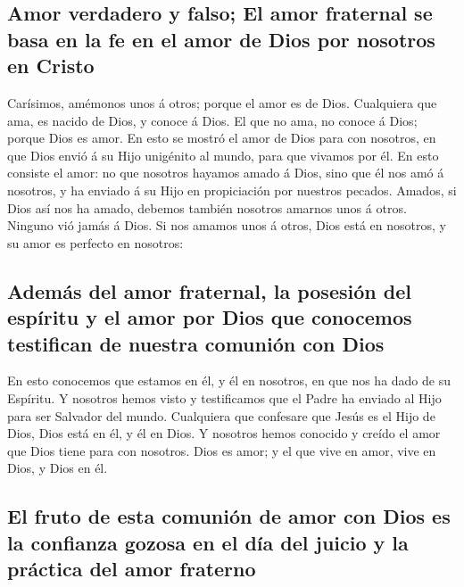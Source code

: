 \hypertarget{amor-verdadero-y-falso-el-amor-fraternal-se-basa-en-la-fe-en-el-amor-de-dios-por-nosotros-en-cristo}{%
\subsection{Amor verdadero y falso; El amor fraternal se basa en la fe
en el amor de Dios por nosotros en
Cristo}\label{amor-verdadero-y-falso-el-amor-fraternal-se-basa-en-la-fe-en-el-amor-de-dios-por-nosotros-en-cristo}}

 Carísimos, amémonos unos á otros; porque el amor es de
Dios. Cualquiera que ama, es nacido de Dios, y conoce á Dios.
 El que no ama, no conoce á Dios; porque Dios es amor.
 En esto se mostró el amor de Dios para con nosotros, en
que Dios envió á su Hijo unigénito al mundo, para que vivamos por él.
 En esto consiste el amor: no que nosotros hayamos amado
á Dios, sino que él nos amó á nosotros, y ha enviado á su Hijo en
propiciación por nuestros pecados.  Amados, si Dios así
nos ha amado, debemos también nosotros amarnos unos á otros.
 Ninguno vió jamás á Dios. Si nos amamos unos á otros,
Dios está en nosotros, y su amor es perfecto en nosotros:

\hypertarget{ademuxe1s-del-amor-fraternal-la-posesiuxf3n-del-espuxedritu-y-el-amor-por-dios-que-conocemos-testifican-de-nuestra-comuniuxf3n-con-dios}{%
\subsection{Además del amor fraternal, la posesión del espíritu y el
amor por Dios que conocemos testifican de nuestra comunión con
Dios}\label{ademuxe1s-del-amor-fraternal-la-posesiuxf3n-del-espuxedritu-y-el-amor-por-dios-que-conocemos-testifican-de-nuestra-comuniuxf3n-con-dios}}

 En esto conocemos que estamos en él, y él en nosotros,
en que nos ha dado de su Espíritu.  Y nosotros hemos
visto y testificamos que el Padre ha enviado al Hijo para ser Salvador
del mundo.  Cualquiera que confesare que Jesús es el Hijo
de Dios, Dios está en él, y él en Dios.  Y nosotros hemos
conocido y creído el amor que Dios tiene para con nosotros. Dios es
amor; y el que vive en amor, vive en Dios, y Dios en él.

\hypertarget{el-fruto-de-esta-comuniuxf3n-de-amor-con-dios-es-la-confianza-gozosa-en-el-duxeda-del-juicio-y-la-pruxe1ctica-del-amor-fraterno}{%
\subsection{El fruto de esta comunión de amor con Dios es la confianza
gozosa en el día del juicio y la práctica del amor
fraterno}\label{el-fruto-de-esta-comuniuxf3n-de-amor-con-dios-es-la-confianza-gozosa-en-el-duxeda-del-juicio-y-la-pruxe1ctica-del-amor-fraterno}}

